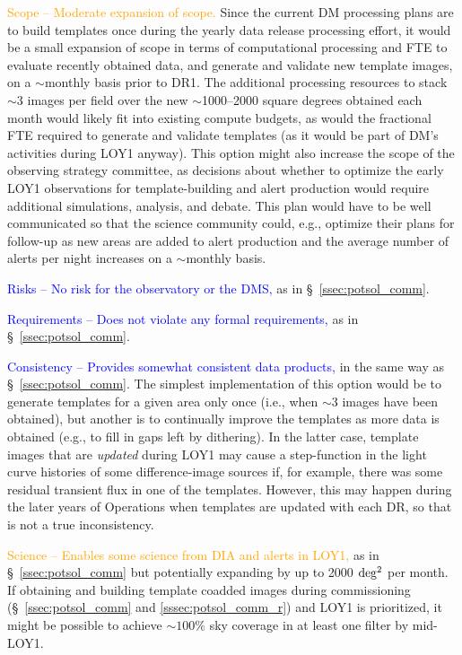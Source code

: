 \documentclass[DM,lsstdraft,toc]{lsstdoc}
\begin{document}
\textcolor{orange}{ Scope -- Moderate expansion of scope.}
Since the current DM processing plans are to build templates once during the yearly data release processing effort, it would be a small expansion of scope in terms of computational processing and FTE to evaluate recently obtained data, and generate and validate new template images, on a $\sim$monthly basis prior to DR1.
The additional processing resources to stack $\sim$3 images per field over the new $\sim$1000--2000 square degrees obtained each month would likely fit into existing compute budgets, as would the fractional FTE required to generate and validate templates (as it would be part of DM's activities during LOY1 anyway).
This option might also increase the scope of the observing strategy committee, as decisions about whether to optimize the early LOY1 observations for template-building and alert production would require additional simulations, analysis, and debate.
This plan would have to be well communicated so that the science community could, e.g., optimize their plans for follow-up as new areas are added to alert production and the average number of alerts per night increases on a $\sim$monthly basis.

\textcolor{blue}{ Risks -- No risk for the observatory or the DMS,} as in \S~\ref{ssec:potsol_comm}. 

\textcolor{blue}{ Requirements -- Does not violate any formal requirements,} as in \S~\ref{ssec:potsol_comm}. 

\textcolor{blue}{ Consistency -- Provides somewhat consistent data products,} in the same way as \S~\ref{ssec:potsol_comm}.
The simplest implementation of this option would be to generate templates for a given area only once (i.e., when $\sim$3 images have been obtained), but another is to continually improve the templates as more data is obtained (e.g., to fill in gaps left by dithering).
In the latter case, template images that are {\em updated} during LOY1 may cause a step-function in the light curve histories of some difference-image sources if, for example, there was some residual transient flux in one of the templates.
However, this may happen during the later years of Operations when templates are updated with each DR, so that is not a true inconsistency.

\textcolor{orange}{ Science -- Enables some science from DIA and alerts in LOY1,} as in \S~\ref{ssec:potsol_comm} but potentially expanding by up to 2000 $\rm deg^2$ per month.
If obtaining and building template coadded images during commissioning (\S~\ref{ssec:potsol_comm} and \ref{sssec:potsol_comm_r}) and LOY1 is prioritized, it might be possible to achieve $\sim100\%$ sky coverage in at least one filter by mid-LOY1.
\end{document}
